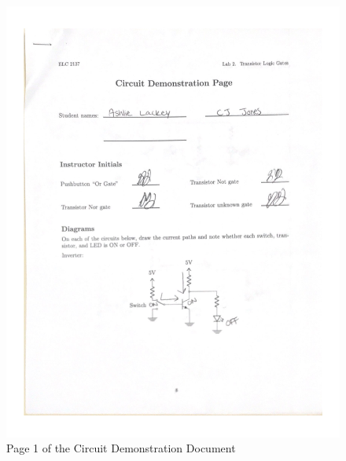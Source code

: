 \documentclass[11pt]{article}
\begin{document}
\begin{figure}
	\includegraphics[page = 1, width=1.0\textwidth]{"Circuit Demonstration"}
	\caption{Page 1 of the Circuit Demonstration Document}

	
\end{figure}
\end{document}
